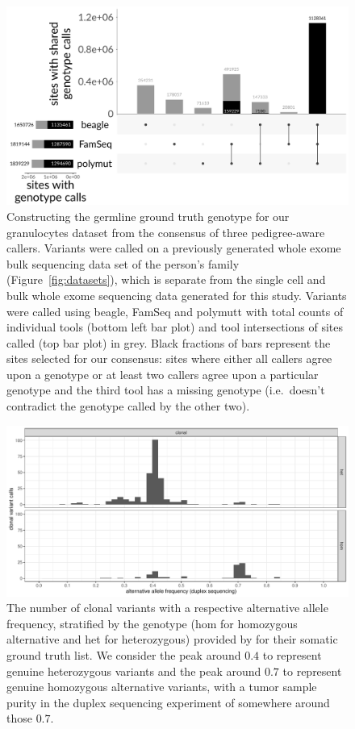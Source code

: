 \documentclass[authoryear,preprint,11pt]{scrartcl}
\begin{document}
\begin{figure}[!tpb]
  \includegraphics[width=\linewidth]{figs/Laehnemann2017/ground_truth/Hoell2014_pedigree_consensus_calling.pdf}
 \caption{
   Constructing the germline ground truth genotype for our granulocytes dataset from the consensus of three pedigree-aware callers.
   Variants were called on a previously generated whole exome bulk sequencing data set of the person's family (Figure~\ref{fig:datasets}), which is separate from the single cell and bulk whole exome sequencing data generated for this study.
   Variants were called using beagle, FamSeq and polymutt with total counts of individual tools (bottom left bar plot) and tool intersections of sites called (top bar plot) in grey.
   Black fractions of bars represent the sites selected for our consensus: sites where either all callers agree upon a genotype or at least two callers agree upon a particular genotype and the third tool has a missing genotype (i.e.~doesn't contradict the genotype called by the other two).
 }
\label{fig:granulocytes-ground-truth}
\end{figure}

\begin{figure}[!tpb]
  \includegraphics[width=\linewidth]{figs/Wang2014/Wang2014_validated_somatic_clonal_zygosity_misclassifications.pdf}
 \caption{
   The number of clonal variants with a respective alternative allele frequency, stratified by the genotype (hom for homozygous alternative and het for heterozygous) provided by \cite{wang_clonal_2014} for their somatic ground truth list.
   We consider the peak around $0.4$ to represent genuine heterozygous variants and the peak around $0.7$ to represent genuine homozygous alternative variants, with a tumor sample purity in the duplex sequencing experiment of somewhere around those $0.7$.
 }
\label{fig:wang-clonals-zygosity}
\end{figure}
\end{document}
